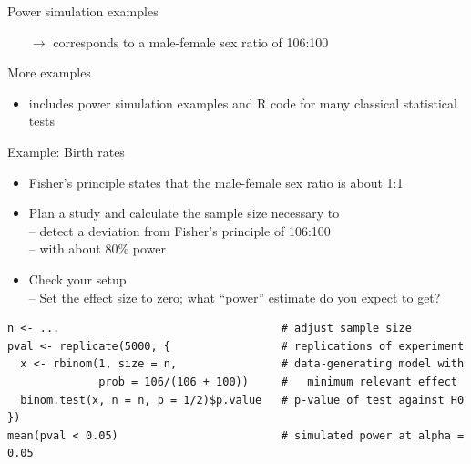 \documentclass[aspectratio=169]{beamer}
\begin{document}
\begin{frame}{Power simulation examples}
\begin{itemize}
\item[$\to$] corresponds to a male-female sex ratio of 106:100\\[2ex]
\end{itemize}

More examples\\[1ex]

\begin{itemize}
\item \citet{Wickelmaier22} includes power simulation examples and R code for
many classical statistical tests
\end{itemize}

\end{frame}


\begin{frame}[fragile]{Example: Birth rates}

\begin{itemize}
\item Fisher's principle states that the male-female sex ratio is about
1:1\\[1ex]

\item Plan a study and calculate the sample size necessary to\\
-- detect a deviation from Fisher's principle of 106:100\\
-- with about 80\% power\\[1ex]

\item Check your setup\\
-- Set the effect size to zero; what ``power'' estimate do you expect to
get?\\[2ex]
\end{itemize}

\begin{lstlisting}[style=numbers]
n <- ...                                  # adjust sample size
pval <- replicate(5000, {                 # replications of experiment
  x <- rbinom(1, size = n,                # data-generating model with
              prob = 106/(106 + 100))     #   minimum relevant effect
  binom.test(x, n = n, p = 1/2)$p.value   # p-value of test against H0
})
mean(pval < 0.05)                         # simulated power at alpha = 0.05
\end{lstlisting}

\end{frame}
\end{document}

